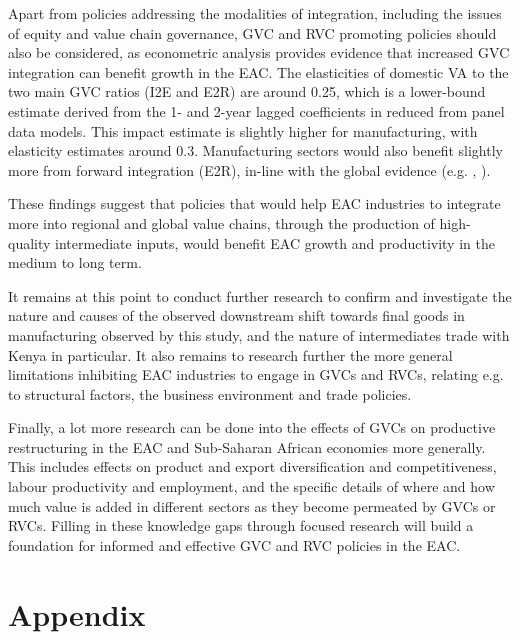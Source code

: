 \documentclass[a4paper]{article}
\begin{document}
Apart from policies addressing the modalities of integration, including the issues of equity and value chain governance, GVC and RVC promoting policies should also be considered, as econometric analysis provides evidence that increased GVC integration can benefit growth in the EAC. The elasticities of domestic VA to the two main GVC ratios  (I2E and E2R) are around 0.25, which is a lower-bound estimate derived from the 1- and 2-year lagged coefficients in reduced from panel data models.  This impact estimate is slightly higher for manufacturing, with elasticity estimates around 0.3. Manufacturing sectors would also benefit slightly more from forward integration (E2R), in-line with the global evidence (e.g.  \citet{Kummritz20161}, \citet{kummritz2015global}). \newline

These findings suggest that policies that would help EAC industries to integrate more into regional and global value chains, through the production of high-quality intermediate inputs, would benefit EAC growth and productivity in the medium to long term. \newline 

It remains at this point to conduct further research to confirm and investigate the nature and causes of the observed downstream shift towards final goods in manufacturing observed by this study, and the nature of intermediates trade with Kenya in particular. It also remains to research further the more general limitations inhibiting EAC industries to engage in GVCs and RVCs, relating e.g. to structural factors, the business environment and trade policies. \newline

Finally, a lot more research can be done into the effects of GVCs on productive restructuring in the EAC and Sub-Saharan African economies more generally. This includes effects on product and export diversification and competitiveness, labour productivity and employment, and the specific details of where and how much value is added in different sectors as they become permeated by GVCs or RVCs. Filling in these knowledge gaps through focused research will build a foundation for informed and effective GVC and RVC policies in the EAC. 



\newpage




\newpage
\section*{Appendix}
\end{document}

